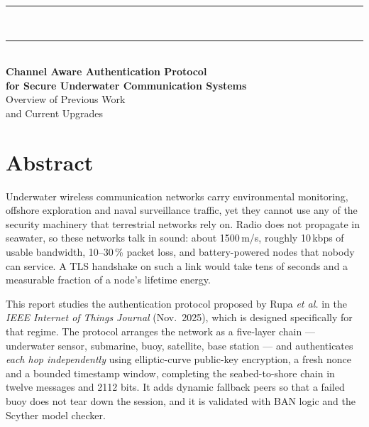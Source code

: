 \begin{titlepage}
\centering
\thispagestyle{empty}

{\color{navy}\rule{\textwidth}{1.6pt}}\\[2pt]
{\color{teal}\rule{\textwidth}{0.6pt}}\\[16mm]

{\sffamily\bfseries\LARGE\color{navy}
Channel Aware Authentication Protocol\\[4pt]
for Secure Underwater Communication Systems\\}
\vspace{7mm}
{\sffamily\Large\color{slate} Overview of Previous Work\\[2pt]
and Current Upgrades}\\[16mm]

\end{titlepage}



\chapter*{Abstract}
\thispagestyle{plain}

\noindent
Underwater wireless communication networks carry environmental monitoring, offshore
exploration and naval surveillance traffic, yet they cannot use any of the security
machinery that terrestrial networks rely on. Radio does not propagate in seawater, so these
networks talk in sound: about 1500\,m/s, roughly 10\,kbps of usable bandwidth, 10--30\,\%
packet loss, and battery-powered nodes that nobody can service. A TLS handshake on such a
link would take tens of seconds and a measurable fraction of a node's lifetime energy.

\vspace{2mm}\noindent
This report studies the authentication protocol proposed by Rupa \emph{et al.} in the
\emph{IEEE Internet of Things Journal} (Nov.\ 2025), which is designed specifically for that
regime. The protocol arranges the network as a five-layer chain --- underwater sensor,
submarine, buoy, satellite, base station --- and authenticates \emph{each hop
independently} using elliptic-curve public-key encryption, a fresh nonce and a bounded
timestamp window, completing the seabed-to-shore chain in twelve messages and 2112 bits.
It adds dynamic fallback peers so that a failed buoy does not tear down the session, and it
is validated with BAN logic and the Scyther model checker.

